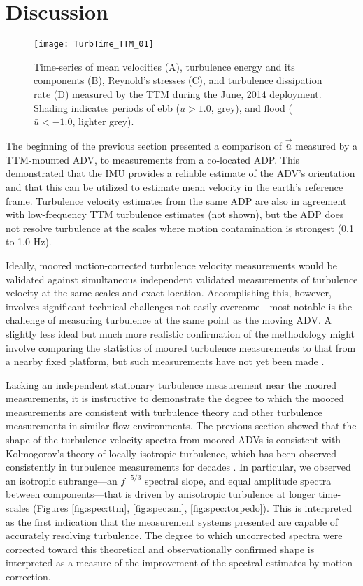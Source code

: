 
\section{Discussion}

\begin{figure*}[t]
  \centering
  \texttt{[image: TurbTime\_TTM\_01]}
  \caption{Time-series of mean velocities (A), turbulence energy and its components (B), Reynold's stresses (C), and turbulence dissipation rate (D) measured by the TTM during the June, 2014 deployment. Shading indicates periods of ebb ($\bar{u}>1.0$, grey), and flood ($\bar{u}<-1.0$, lighter grey).}
  \label{fig:turbtime:ttm}
\end{figure*}

The beginning of the previous section presented a comparison of $\vec{\bar{u}}$ measured by a TTM-mounted ADV, to measurements from a co-located ADP. This demonstrated that the IMU provides a reliable estimate of the ADV's orientation and that this can be utilized to estimate mean velocity in the earth's reference frame. Turbulence velocity estimates from the same ADP are also in agreement with low-frequency TTM turbulence estimates (not shown), but the ADP does not resolve turbulence at the scales where motion contamination is strongest (0.1 to 1.0 Hz).

Ideally, moored motion-corrected turbulence velocity measurements would be validated against simultaneous independent validated measurements of turbulence velocity at the same scales and exact location. Accomplishing this, however, involves significant technical challenges not easily overcome---most notable is the challenge of measuring turbulence at the same point as the moving ADV. A slightly less ideal but much more realistic confirmation of the methodology might involve comparing the statistics of moored turbulence measurements to that from a nearby fixed platform, but such measurements have not yet been made \citep[e.g. the `TTT' platform described in][]{Thomson++2012}.

Lacking an independent stationary turbulence measurement near the moored measurements, it is instructive to demonstrate the degree to which the moored measurements are consistent with turbulence theory and other turbulence measurements in similar flow environments. The previous section showed that the shape of the turbulence velocity spectra from moored ADVs is consistent with Kolmogorov's theory of locally isotropic turbulence, which has been observed consistently in turbulence measurements for decades \citep[]{Kolmogorov1941c,Grant++1962,McMillan++2016}. In particular, we observed an isotropic subrange---an $f^{-5/3}$ spectral slope, and equal amplitude spectra between components---that is driven by anisotropic turbulence at longer time-scales (Figures \ref{fig:spec:ttm}, \ref{fig:spec:sm}, \ref{fig:spec:torpedo}). This is interpreted as the first indication that the measurement systems presented are capable of accurately resolving turbulence. The degree to which uncorrected spectra were corrected toward this theoretical and observationally confirmed shape is interpreted as a measure of the improvement of the spectral estimates by motion correction.


